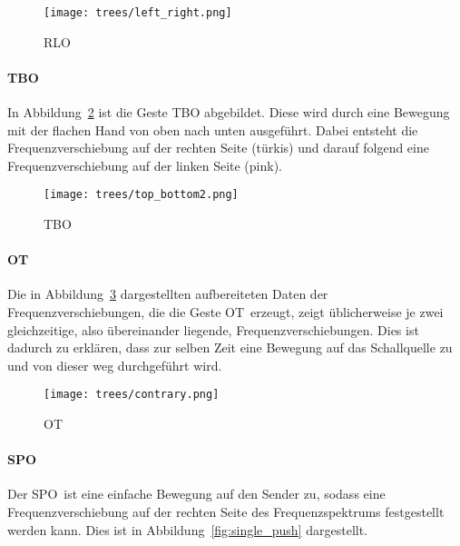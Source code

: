 \begin{figure}[htbp] \centering
\texttt{[image: trees/left\_right.png]}
\caption{\acl{RLO}}
\label{fig:left_right}
\end{figure}


\paragraph*{\acl{TBO}}
In Abbildung~\ref{fig:top_bottom} ist die Geste \acl{TBO} abgebildet. Diese wird durch eine Bewegung mit der flachen Hand von oben nach unten ausgeführt. Dabei entsteht die Frequenzverschiebung auf der rechten Seite (türkis) und darauf folgend eine Frequenzverschiebung auf der linken Seite (pink). 


\begin{figure}[htbp] \centering
\texttt{[image: trees/top\_bottom2.png]}
\caption{\acl{TBO}}
\label{fig:top_bottom}
\end{figure}

\paragraph*{\acl{OT}}
Die in Abbildung~\ref{fig:contrary} dargestellten aufbereiteten Daten der Frequenzverschiebungen, die die Geste \glqq \acl{OT}\grqq\ erzeugt, zeigt üblicherweise je zwei gleichzeitige, also übereinander liegende, Frequenzverschiebungen. Dies ist dadurch zu erklären, dass zur selben Zeit eine Bewegung auf das Schallquelle zu und von dieser weg durchgeführt wird.

\begin{figure}[htbp] \centering
\texttt{[image: trees/contrary.png]}
\caption{\acl{OT}}
\label{fig:contrary}
\end{figure}


\paragraph*{\acl{SPO}}
Der \glqq \acl{SPO}\grqq\ ist eine einfache Bewegung auf den Sender zu, sodass eine Frequenzverschiebung auf der rechten Seite des Frequenzspektrums festgestellt werden kann. Dies ist in Abbildung~\ref{fig:single_push} dargestellt.


